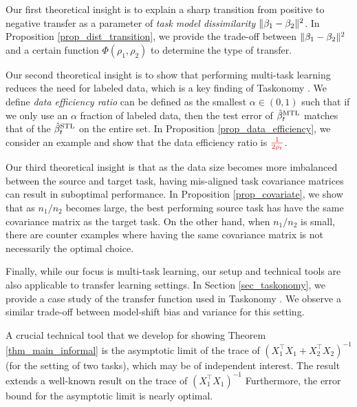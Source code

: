 Our first theoretical insight is to explain a sharp transition from positive to negative transfer as a parameter of \textit{task model dissimilarity} $\|\beta_1 - \beta_2\|^2$.
	In Proposition \ref{prop_dist_transition}, we provide the trade-off between $\|\beta_1 - \beta_2\|^2$ and a certain function $\Phi(\rho_1, \rho_2)$ to determine the type of transfer.

Our second theoretical insight is to show that performing multi-task learning reduces the need for labeled data, which is a key finding of Taskonomy \cite{ZSSGM18}.
	We define \textit{data efficiency ratio} can be defined as the smallest $\alpha\in(0, 1)$ such that if we only use an $\alpha$ fraction of labeled data, then the test error of $\hat{\beta}_t^{\text{MTL}}$ matches that of the $\hat{\beta}_t^{\text{STL}}$ on the entire set.
	In Proposition \ref{prop_data_efficiency}, we consider an example and show that the data efficiency ratio is $\textcolor{red}{\frac {1}{2\rho_t}}$.

Our third theoretical insight is that as the data size becomes more imbalanced between the source and target task, having mis-aligned task covariance matrices can result in suboptimal performance.
	In Proposition \ref{prop_covariate}, we show that as $n_1 / n_2$ becomes large, the best performing source task has have the same covariance matrix as the target task.
	On the other hand, when $n_1 / n_2$ is small, there are counter examples where having the same covariance matrix is not necessarily the optimal choice.


Finally, while our focus is multi-task learning, our setup and technical tools are also applicable to transfer learning settings.
In Section \ref{sec_taskonomy}, we provide a case study of the transfer function used in Taskonomy \cite{ZSSGM18}.
We observe a similar trade-off between model-shift bias and variance for this setting.

A crucial technical tool that we develop for showing Theorem \ref{thm_main_informal} is the asymptotic limit of the trace of $(X_1^{\top}X_1 + X_2^{\top}X_2)^{-1}$ (for the setting of two tasks), which may be of independent interest.
The result extends a well-known result on the trace of $(X_1^{\top}X_1)^{-1}$ \cite{S07}
Furthermore, the error bound for the asymptotic limit is nearly optimal.

